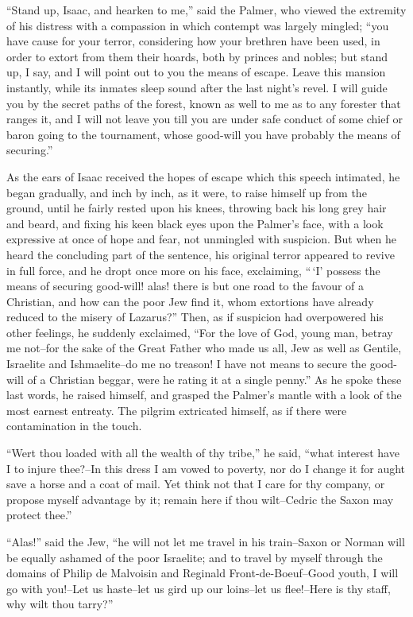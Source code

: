 ``Stand up, Isaac, and hearken to me,'' said the Palmer, who viewed the
extremity of his distress with a compassion in which contempt was
largely mingled; ``you have cause for your terror, considering how your
brethren have been used, in order to extort from them their hoards, both
by princes and nobles; but stand up, I say, and I will point out to you
the means of escape. Leave this mansion instantly, while its inmates
sleep sound after the last night's revel. I will guide you by the secret
paths of the forest, known as well to me as to any forester that ranges
it, and I will not leave you till you are under safe conduct of some
chief or baron going to the tournament, whose good-will you have
probably the means of securing.''

As the ears of Isaac received the hopes of escape which this speech
intimated, he began gradually, and inch by inch, as it were, to raise
himself up from the ground, until he fairly rested upon his knees,
throwing back his long grey hair and beard, and fixing his keen black
eyes upon the Palmer's face, with a look expressive at once of hope and
fear, not unmingled with suspicion. But when he heard the concluding
part of the sentence, his original terror appeared to revive in full
force, and he dropt once more on his face, exclaiming, ``\,`I' possess
the means of securing good-will! alas! there is but one road to the
favour of a Christian, and how can the poor Jew find it, whom extortions
have already reduced to the misery of Lazarus?'' Then, as if suspicion
had overpowered his other feelings, he suddenly exclaimed, ``For the
love of God, young man, betray me not--for the sake of the Great Father
who made us all, Jew as well as Gentile, Israelite and Ishmaelite--do me
no treason! I have not means to secure the good-will of a Christian
beggar, were he rating it at a single penny.'' As he spoke these last
words, he raised himself, and grasped the Palmer's mantle with a look of
the most earnest entreaty. The pilgrim extricated himself, as if there
were contamination in the touch.

``Wert thou loaded with all the wealth of thy tribe,'' he said, ``what
interest have I to injure thee?--In this dress I am vowed to poverty,
nor do I change it for aught save a horse and a coat of mail. Yet think
not that I care for thy company, or propose myself advantage by it;
remain here if thou wilt--Cedric the Saxon may protect thee.''

``Alas!'' said the Jew, ``he will not let me travel in his train--Saxon
or Norman will be equally ashamed of the poor Israelite; and to travel
by myself through the domains of Philip de Malvoisin and Reginald
Front-de-Boeuf--Good youth, I will go with you!--Let us haste--let us
gird up our loins--let us flee!--Here is thy staff, why wilt thou
tarry?''

